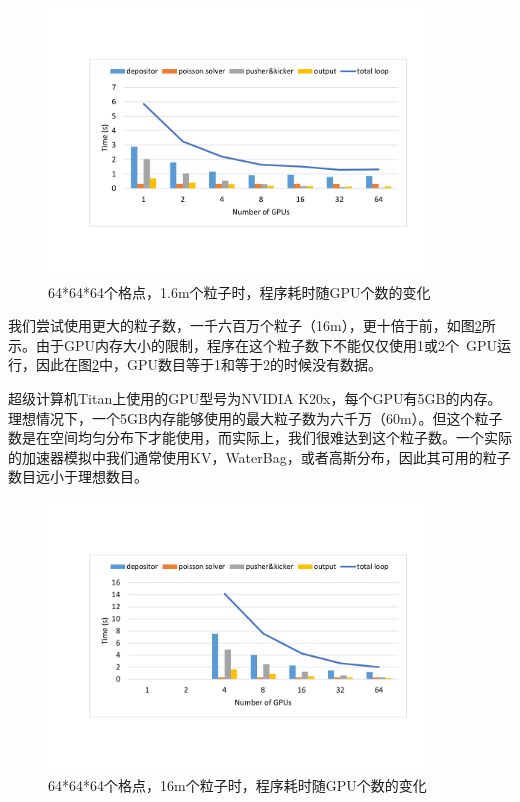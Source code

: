 \begin{figure}[!htb]
  \centering
  \includegraphics[width=0.9\textwidth]{Img/PIC_speedup_Titan_1_6m.pdf}
  \caption{64*64*64个格点，1.6m个粒子时，程序耗时随GPU个数的变化}
  \label{fig:PIC_speedup_Titan_1_6m}
\end{figure}

我们尝试使用更大的粒子数，一千六百万个粒子（16m），更十倍于前，如图\ref{fig:PIC_speedup_Titan_16m}所示。由于GPU内存大小的限制，程序在这个粒子数下不能仅仅使用1或2个~GPU运行，因此在图\ref{fig:PIC_speedup_Titan_16m}中，GPU数目等于1和等于2的时候没有数据。

超级计算机Titan上使用的GPU型号为NVIDIA K20x，每个GPU有5GB的内存。理想情况下，一个5GB内存能够使用的最大粒子数为六千万（60m）。但这个粒子数是在空间均匀分布下才能使用，而实际上，我们很难达到这个粒子数。一个实际的加速器模拟中我们通常使用KV，WaterBag，或者高斯分布，因此其可用的粒子数目远小于理想数目。

\begin{figure}[!htb]
  \centering
  \includegraphics[width=0.9\textwidth]{Img/PIC_speedup_Titan_16m.pdf}
  \caption{64*64*64个格点，16m个粒子时，程序耗时随GPU个数的变化}
  \label{fig:PIC_speedup_Titan_16m}
\end{figure}

